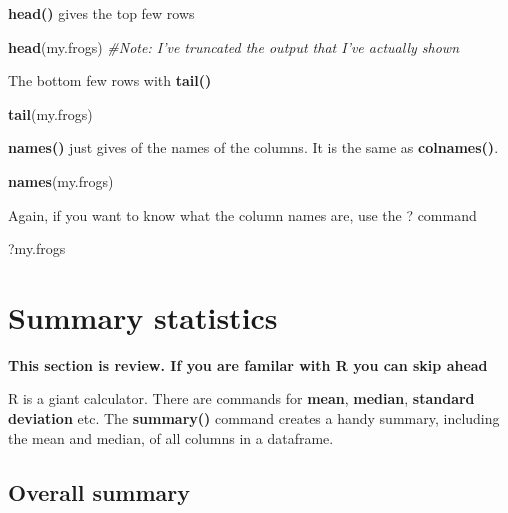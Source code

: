 \documentclass[]{book}
\newenvironment{Shaded}{\begin{snugshade}}{\end{snugshade}}
\newcommand{\KeywordTok}[1]{\textcolor[rgb]{0.13,0.29,0.53}{\textbf{#1}}}
\newcommand{\CommentTok}[1]{\textcolor[rgb]{0.56,0.35,0.01}{\textit{#1}}}
\newcommand{\NormalTok}[1]{#1}
\theoremstyle{definition}
\theoremstyle{definition}
\theoremstyle{definition}
\theoremstyle{remark}
\begin{document}
\textbf{head()} gives the top few rows

\begin{Shaded}
\begin{Highlighting}[]
\KeywordTok{head}\NormalTok{(my.frogs) }\CommentTok{#Note: I've truncated the output that I've actually shown}
\end{Highlighting}
\end{Shaded}

The bottom few rows with \textbf{tail()}

\begin{Shaded}
\begin{Highlighting}[]
\KeywordTok{tail}\NormalTok{(my.frogs)}
\end{Highlighting}
\end{Shaded}

\textbf{names()} just gives of the names of the columns. It is the same
as \textbf{colnames()}.

\begin{Shaded}
\begin{Highlighting}[]
\KeywordTok{names}\NormalTok{(my.frogs)}
\end{Highlighting}
\end{Shaded}

Again, if you want to know what the column names are, use the ? command

\begin{Shaded}
\begin{Highlighting}[]
\NormalTok{?my.frogs}
\end{Highlighting}
\end{Shaded}

\section{Summary statistics}\label{summary-statistics}

\textbf{This section is review. If you are familar with R you can skip
ahead}

R is a giant calculator. There are commands for \textbf{mean},
\textbf{median}, \textbf{standard deviation} etc. The \textbf{summary()}
command creates a handy summary, including the mean and median, of all
columns in a dataframe.

\subsection{Overall summary}\label{overall-summary}
\end{document}
